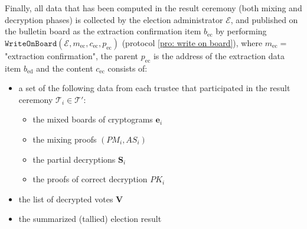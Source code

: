 Finally, all data that has been computed in the result ceremony (both mixing and decryption phases) is collected by the election administrator $\mathcal{E}$, and published on the bulletin board as the extraction confirmation item $b_\mathrm{ec}$ by performing $\mathtt{WriteOnBoard}(\mathcal{E}, m_\mathrm{ec}, c_\mathrm{ec}, p_\mathrm{ec})$ (protocol \ref{pro: write on board}), where $m_\mathrm{ec} = $ "extraction confirmation", the parent $p_\mathrm{ec}$ is the address of the extraction data item $b_\mathrm{ed}$  and the content $c_\mathrm{ec}$ consists of:
\begin{itemize}
    \item a set of the following data from each trustee that participated in the result ceremony $\mathcal{T}_i \in \boldsymbol{\mathcal{T}'}$:
    \begin{itemize}
        \item the mixed boards of cryptograms $\boldsymbol{e}_i$
        \item the mixing proofs $(PM_i, AS_i)$
        \item the partial decryptions $\boldsymbol{S}_i$
        \item the proofs of correct decryption $PK_i$
    \end{itemize}
    \item the list of decrypted votes $\boldsymbol{V}$
    \item the summarized (tallied) election result
\end{itemize}
